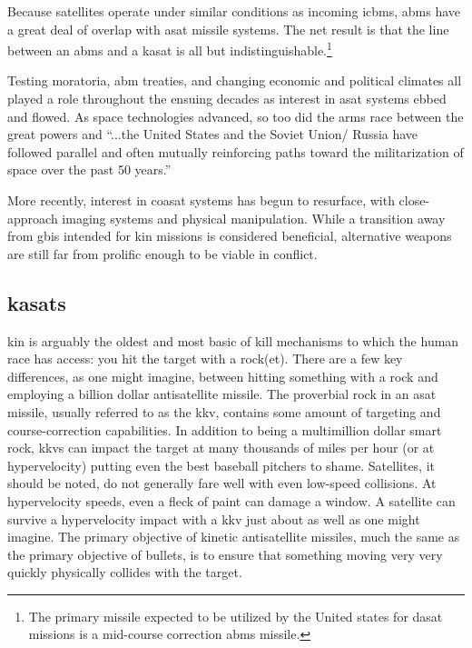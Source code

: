 Because satellites operate under similar conditions as incoming
\acp{icbm}, \acs{abms} have a great deal of overlap with \ac{asat}
missile systems.  The net result is that the line between an \ac{abms}
and a \ac{kasat} is all but indistinguishable.\footnote{The primary
missile expected to be utilized by the United states for \ac{dasat}
missions is a mid-course correction \ac{abms}
missile.\cite[p01-15]{brian}}

Testing moratoria, \ac{abm} treaties, and changing economic and
political climates all played a role throughout the ensuing decades as
interest in \ac{asat} systems ebbed and flowed.\cite{grego} As space
technologies advanced, so too did the arms race between the great
powers and ``...the United States and the Soviet Union/ Russia have
followed parallel and often mutually reinforcing paths toward the
militarization of space over the past 50 years.''\cite[p2]{grego}

More recently, interest in \ac{coasat} systems has begun to resurface,
with close-approach imaging systems \cite[p01-03, p02-13,
  p03-09]{brian} and physical manipulation.\cite[p03-08]{brian} While
a transition away from \acp{gbi} intended for \ac{kin} missions is
considered beneficial, alternative weapons are still far from prolific
enough to be viable in conflict.

\subsection{\acfp{kasat}}

\acl{kin} is arguably the oldest and most basic of kill mechanisms to
which the human race has access: you hit the target with a
rock(et). There are a few key differences, as one might imagine,
between hitting something with a rock and employing a billion dollar
antisatellite missile.  The proverbial rock in an \ac{asat} missile,
usually referred to as the \acf{kkv}, contains some amount of
targeting and course-correction capabilities.\cite{sm3} In addition to
being a multimillion dollar smart rock, \acp{kkv} can impact the
target at many thousands of miles per hour (or at hypervelocity)
putting even the best baseball pitchers to shame.  Satellites, it
should be noted, do not generally fare well with even low-speed
collisions.\cite{whoopsies} At hypervelocity speeds, even a fleck of
paint can damage a window.\cite{paint-is-power} A satellite can
survive a hypervelocity impact with a \ac{kkv} just about as well as
one might imagine.\cite{kessler-reunion} The primary objective of
kinetic antisatellite missiles, much the same as the primary objective
of bullets, is to ensure that something moving very very quickly
physically collides with the target.


